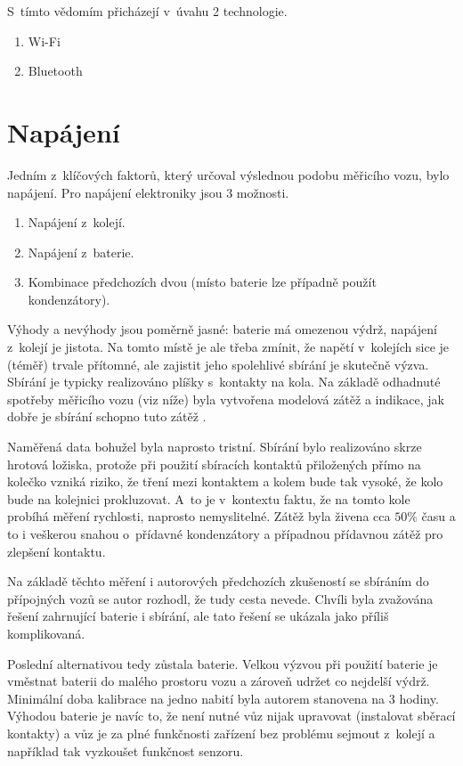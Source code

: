 S~tímto vědomím přicházejí v~úvahu 2 technologie.

\begin{enumerate}
\item Wi-Fi
\item Bluetooth
\end{enumerate}

\section{Napájení}
\label{sec:wsm-napajeni}

Jedním z~klíčových faktorů, který určoval výslednou podobu měřicího vozu, bylo
napájení. Pro napájení elektroniky jsou 3 možnosti.

\begin{enumerate}
\item Napájení z~kolejí.
\item Napájení z~baterie.
\item Kombinace předchozích dvou (místo baterie lze případně použít kondenzátory).
\end{enumerate}

Výhody a nevýhody jsou poměrně jasné: baterie má omezenou výdrž, napájení
z~kolejí je jistota. Na tomto místě je ale třeba zmínit, že napětí v~kolejích
sice je (téměř) trvale přítomné, ale zajistit jeho spolehlivé sbírání je
skutečně výzva. Sbírání je typicky realizováno plíšky s~kontakty na kola.
Na základě odhadnuté spotřeby měřicího vozu (viz níže) byla vytvořena modelová
zátěž a indikace, jak dobře je sbírání schopno tuto zátěž .

Naměřená data bohužel byla naprosto tristní. Sbírání bylo realizováno skrze
hrotová ložiska, protože při použití sbíracích kontaktů přiložených přímo na
kolečko vzniká riziko, že tření mezi kontaktem a kolem bude tak vysoké, že kolo
bude na kolejnici prokluzovat. A~to je v~kontextu faktu, že na tomto kole
probíhá měření rychlosti, naprosto nemyslitelné. Zátěž byla živena cca $50 \%$
času a to i veškerou snahou o~přídavné kondenzátory a případnou přídavnou zátěž
pro zlepšení kontaktu.

Na základě těchto měření i autorových předchozích zkušeností se sbíráním
do přípojných vozů se autor rozhodl, že tudy cesta nevede. Chvíli byla zvažována
řešení zahrnující baterie i sbírání, ale tato řešení se ukázala jako příliš
komplikovaná.

Poslední alternativou tedy zůstala baterie. Velkou výzvou při použití baterie
je vměstnat baterii do malého prostoru vozu a zároveň udržet co nejdelší výdrž.
Minimální doba kalibrace na jedno nabití byla autorem stanovena na 3 hodiny.
Výhodou baterie je navíc to, že není nutné vůz nijak upravovat (instalovat
sběrací kontakty) a vůz je za plné funkčnosti zařízení bez problému sejmout
z~kolejí a například tak vyzkoušet funkčnost senzoru.

